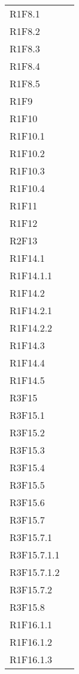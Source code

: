 \begin{longtable}{ >{\centering}p{}
		>{\centering}p{}}
	\\R1F8.1 \\R1F8.2 \\R1F8.3 \\R1F8.4 \\R1F8.5 \\R1F9 \\R1F10 \\R1F10.1 \\R1F10.2 \\R1F10.3 \\R1F10.4 \\R1F11 \\R1F12 \\R2F13 \\R1F14.1 \\R1F14.1.1 \\R1F14.2 \\R1F14.2.1 \\R1F14.2.2 \\R1F14.3 \\R1F14.4 \\R1F14.5 \\R3F15 \\R3F15.1 \\R3F15.2 \\R3F15.3 \\R3F15.4 \\R3F15.5 \\R3F15.6 \\R3F15.7 \\R3F15.7.1 \\R3F15.7.1.1 \\R3F15.7.1.2 \\R3F15.7.2 \\R3F15.8 \\R1F16.1.1 \\R1F16.1.2 \\R1F16.1.3 
	

\end{longtable}
